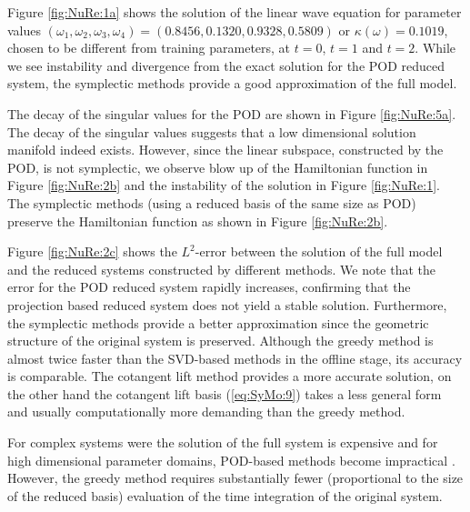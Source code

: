 Figure \ref{fig:NuRe:1a} shows the solution of the linear wave equation for parameter values {\edit $(\omega_1,\omega_2,\omega_3,\omega_4) = (0.8456,0.1320,0.9328,0.5809)$ or $\kappa(\omega) = 0.1019$}, chosen to be different from training parameters, at $t=0$, $t = 1$ and $t=2$. While we see instability and divergence from the exact solution for the POD reduced system, the symplectic methods provide a good approximation of the full model. 

{\edit The decay of the singular values for the POD are shown in Figure \ref{fig:NuRe:5a}. The decay} of the singular values suggests that a low dimensional solution manifold indeed exists. However, since the linear subspace, constructed by the POD, is not symplectic, we observe blow up of the Hamiltonian function in Figure \ref{fig:NuRe:2b} and the instability of the solution in Figure \ref{fig:NuRe:1}. The symplectic methods (using a reduced basis of the same size as POD) preserve the Hamiltonian function as shown in Figure \ref{fig:NuRe:2b}.

Figure \ref{fig:NuRe:2c} shows the $L^2$-error between the solution of the full model and the reduced systems constructed by different methods. We note that the error for the POD reduced system rapidly increases, confirming that {\edit the} projection based reduced system does not yield a stable solution. Furthermore, the symplectic methods provide a better approximation since the geometric structure of the original system is preserved. Although the greedy method is almost {\edit twice faster than the SVD-based methods} in the offline stage, its accuracy is comparable. {\edit The cotangent lift method provides a more accurate solution, on the other hand the cotangent lift basis (\ref{eq:SyMo:9}) takes a less general form and usually computationally more demanding than the greedy method.}

{\edit For complex systems were the solution of the full system is expensive and for high dimensional parameter domains, POD-based methods become impractical \cite{Anonymous:2016wl,Quarteroni:2016wi}. However, the greedy method requires substantially fewer (proportional to the size of the reduced basis) evaluation of the time integration of the original system.}



